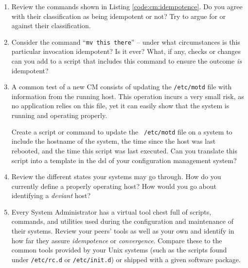 \begin{enumerate}
\item
Review the commands shown in Listing
\ref{code:cm:idempotence}.  Do you agree with their
classification as being idempotent or not?  Try to
argue for or against their classification.

\item
Consider the command ``{\tt mv this there}'' -- under
what circumstances is this particular invocation
idempotent?  Is it ever?  What, if any, checks or
changes can you add to a script that includes this
command to ensure the outcome {\em is} idempotent?

\item
A common test of a new CM consists of updating the
{\tt /etc/motd} file with information from the running
host.  This operation incurs a very small risk, as no
application relies on this file, yet it can easily
show that the system is running and operating
properly.

Create a script or command to update the {\tt
/etc/motd} file on a system to include the hostname of
the system, the time since the host was last rebooted,
and the time this script was last executed.  Can you
translate this script into a template in the \gls{dsl}
of your configuration management system?

\item
Review the different states your systems may go
through.  How do you currently define a properly
operating host?  How would you go about identifying a
{\em deviant} host?

\item
Every System Administrator has a virtual tool chest
full of scripts, commands, and utilities used during
the configuration and maintenance of their systems.
Review your peers' tools as well as your own and
identify in how far they assure {\em idempotence} or
{\em convergence}.  Compare these to the common tools
provided by your Unix systems (such as the scripts
found under {\tt /etc/rc.d} or {\tt /etc/init.d}) or
shipped with a given software package.

\end{enumerate}

\vfill
\pagebreak


